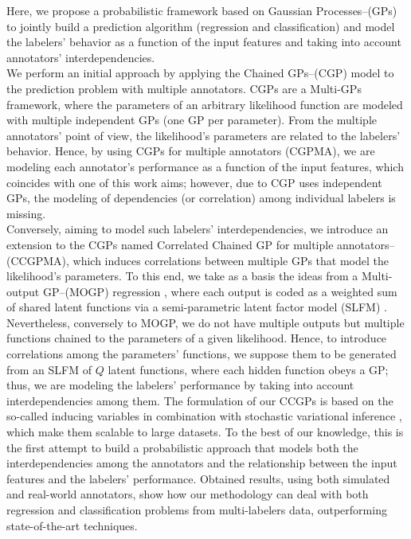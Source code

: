 \documentclass[journal]{IEEEtran}
\begin{document}
Here, we propose a probabilistic framework based on Gaussian Processes--(GPs) to jointly build a prediction algorithm (regression and classification) and model the labelers' behavior as a function of the input features and taking into account annotators' interdependencies.\\
We perform an initial approach by applying the Chained GPs--(CGP) \cite{saul2016chained} model to the prediction problem with multiple annotators. CGPs are a Multi-GPs framework, where the parameters of an arbitrary likelihood function are modeled with multiple independent GPs (one GP per parameter). From the multiple annotators' point of view, the likelihood's parameters are related to the labelers' behavior. Hence, by using CGPs for multiple annotators (CGPMA), we are modeling each annotator's performance as a function of the input features, which coincides with one of this work aims; however, due to CGP uses independent GPs, the modeling of dependencies (or correlation) among individual labelers is missing.\\
Conversely, aiming to model such labelers' interdependencies, we introduce an extension to the CGPs named Correlated Chained GP for multiple annotators--(CCGPMA), which induces correlations between multiple GPs that model the likelihood's parameters. To this end, we take as a basis the ideas from a Multi-output GP--(MOGP) regression \cite{alvarez2012kernels}, where each output is coded as a weighted sum of shared latent functions via a semi-parametric latent factor model (SLFM) \cite{teh2005semiparametric}. Nevertheless, conversely to MOGP, we do not have multiple outputs but multiple functions chained to the parameters of a given likelihood. Hence, to introduce correlations among the parameters' functions, we suppose them to be generated from an SLFM of $Q$ latent functions, where each hidden function obeys a GP; thus, we are modeling the labelers' performance by taking into account interdependencies among them. The formulation of our CCGPs is based on the so-called inducing variables \cite{alvarez2010efficient} in combination with stochastic variational inference \cite{hoffman2013stochastic}, which make them scalable to large datasets. To the best of our knowledge, this is the first attempt to build a probabilistic approach that models both the interdependencies among the annotators and the relationship between the input features and the labelers' performance. Obtained results, using both simulated and real-world annotators, show how our methodology can deal with both regression and classification problems from multi-labelers data, outperforming state-of-the-art techniques.
\end{document}
